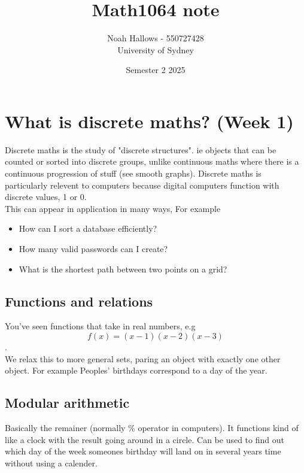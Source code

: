 \documentclass[a4paper, 11pt]{report}
\title{Math1064 note \\ }
\author{Noah Hallows - 550727428 \\ University of Sydney}
\date{Semester 2 2025}
\begin{document}
    \begin{titlepage}
    \maketitle
    \end{titlepage}
    
    \tableofcontents
    
    \newpage
    \section{What is discrete maths? (Week 1)}
	Discrete maths is the study of "discrete structures". ie objects that can be counted or sorted into discrete groups, unlike continuous maths where there is a continuous progression of stuff (see smooth graphs). Discrete maths is particularly relevent to computers because digital computers function with discrete values, 1 or 0.\\
	This can appear in application in many ways, For example\\
	\begin{itemize}
		\item How can I sort a database efficiently?
		\item How many valid passwords can I create?
		\item What is the shortest path between two points on a grid?
	\end{itemize}
	\subsection{Functions and relations}
	You've seen functions that take in real numbers, e.g \[f(x) = (x-1)(x-2)(x-3)\]. \\
	We relax this to more general sets, paring an object with exactly one other object. For example Peoples' birthdays correspond to a day of the year.
	\subsection{Modular arithmetic}
	Basically the remainer (normally \% operator in computers). It functions kind of like a clock with the result going around in a circle. Can be used to find out which day of the week someones birthday will land on in several years time without using a calender.
\end{document}
